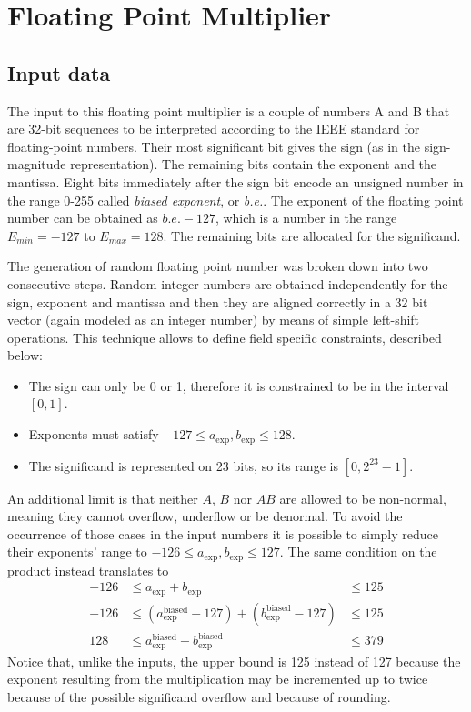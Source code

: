 \chapter{Floating Point Multiplier}

\section{Input data}
The input to this floating point multiplier is a couple of numbers A and B that are 32-bit sequences to be interpreted according to the IEEE standard for floating-point numbers. Their most significant bit gives the sign (as in the sign-magnitude representation). The remaining bits contain the exponent and the mantissa. Eight bits immediately after the sign bit encode an unsigned number in the range 0-255 called \textit{biased exponent}, or \textit{b.e.}. The exponent of the floating point number can be obtained as $\textit{b.e.} - 127$, which is a number in the range $E_{min} = -127$ to $E_{max}=128$.
The remaining bits are allocated for the significand.

The generation of random floating point number was broken down into two consecutive steps. Random integer numbers are obtained independently for the sign, exponent and mantissa and then they are aligned correctly in a 32 bit vector (again modeled as an integer number) by means of simple left-shift operations. This technique allows to define field specific constraints, described below:
\begin{itemize}
    \item The sign can only be 0 or 1, therefore it is constrained to be in the interval $[0,1]$.
    \item Exponents must satisfy $-127 \leq a_\text{exp}, b_\text{exp} \leq 128$.
    \item The significand is represented on 23 bits, so its range is $[0, 2^{23}-1]$.
\end{itemize}
An additional limit is that neither $A$, $B$ nor $AB$ are allowed to be non-normal, meaning they cannot overflow, underflow or be denormal. To avoid the occurrence of those cases in the input numbers it is possible to simply reduce their exponents' range to $-126 \leq a_\text{exp}, b_\text{exp} \leq 127$. The same condition on the product instead translates to
\begin{align}
-126 &\leq  a_\text{exp}                      + b_\text{exp} &\leq 125 \nonumber\\
-126 &\leq (a_\text{exp}^\text{biased} - 127) + (b_\text{exp}^\text{biased} - 127) &\leq 125 \nonumber\\
 128 &\leq  a_\text{exp}^\text{biased}        + b_\text{exp}^\text{biased} &\leq 379 \label{eqn:constraint}
\end{align}
Notice that, unlike the inputs, the upper bound is 125 instead of 127 because the exponent resulting from the multiplication may be incremented up to twice because of the possible significand overflow and because of rounding.


